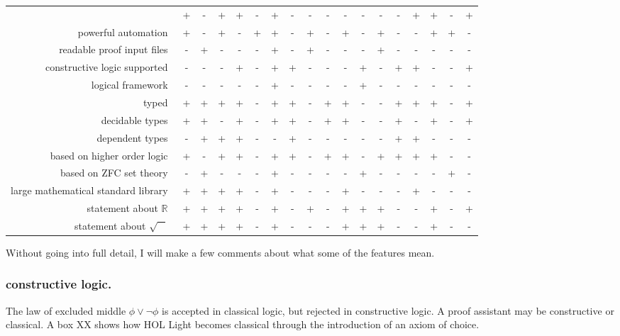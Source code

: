 \documentclass{llncs}
\newcommand{\ring}[1]{\mathbb{#1}}
\begin{document}
\begin{tabular}{|r|ccccc|ccccc|ccccc|cc|}
&+ &- &+ &+  &- &+ &- &-  &- &- &- &-  &- &+ &+ &-  &+ 
\\
powerful automation~
&+ &- &+ &-  &+ &+ &- &+  &- &+ &- &+  &- &- &+ &+  &- 
\\
readable proof input files~
&- &+ &- &-  &- &+ &- &+  &- &- &- &+  &- &- &- &-  &- 
\\
\hline
constructive logic supported~
&- &- &- &+  &- &+ &+ &-  &- &- &+ &-  &+ &+ &- &-  &+ 
\\
logical framework~
&- &- &- &-  &- &+ &- &-  &- &- &+ &-  &- &- &- &-  &- 
\\
typed~
&+ &+ &+ &+  &- &+ &+ &-  &+ &+ &- &-  &+ &+ &+ &-  &+ 
\\
decidable types~
&+ &+ &- &+  &- &+ &+ &-  &+ &+ &- &-  &+ &- &+ &-  &+ 
\\
dependent types~
&- &+ &+ &+  &- &- &+ &-  &- &- &- &-  &+ &+ &- &-  &- 
\\
\hline
based on higher order logic~
&+ &- &+ &+  &- &+ &+ &-  &+ &+ &- &+  &+ &+ &+ &-  &- 
\\
based on ZFC set theory~
&- &+ &- &-  &- &+ &- &-  &- &- &+ &-  &- &- &- &+  &- 
\\
large mathematical standard library~
&+ &+ &+ &+  &- &+ &- &-  &- &+ &- &-  &- &+ &- &-  &- 
\\
statement about $\ring{R}$~
&+ &+ &+ &+  &- &+ &- &+  &- &+ &+ &+  &- &- &+ &-  &+ 
\\
statement about $\sqrt{\phantom X}$~
&+ &+ &+ &+  &- &+ &- &-  &- &+ &+ &+  &- &- &+ &-  &- 
\\
\hline
\end{tabular}


\bigskip
Without going into full detail, I will make a few comments about what
some of the features mean.

\subsubsection{constructive logic.} The
law of excluded middle $\phi\lor\lnot \phi$ is accepted in classical
logic, but rejected in constructive logic.  A proof assistant
may be constructive or classical.  A box XX shows how HOL Light becomes
classical through the introduction of an axiom of choice.
\end{document}
